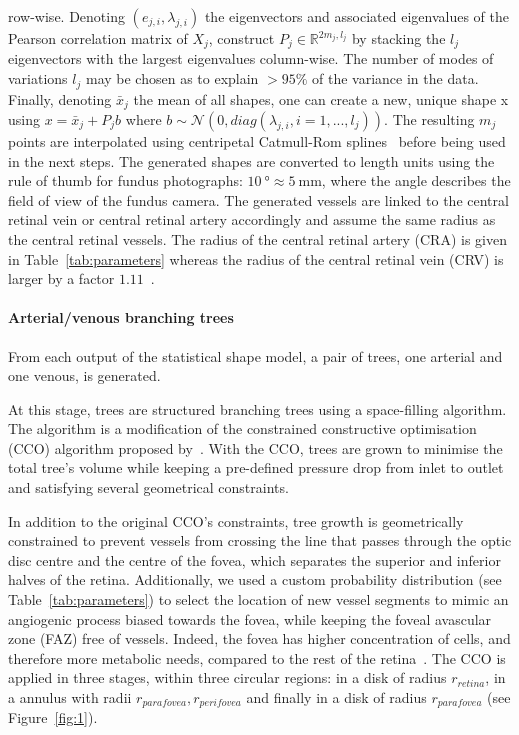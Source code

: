 \documentclass[11pt,]{article}
\begin{document}
row-wise. Denoting $(e_{j,i}, \lambda_{j,i})$ the eigenvectors and
associated eigenvalues of the Pearson correlation matrix of $X_j$,
construct $P_j\in\mathbb R^{2m_j,l_j}$ by stacking the $l_j$
eigenvectors with the largest eigenvalues column-wise. The number of
modes of variations $l_j$ may be chosen as to explain $>95\%$ of the
variance in the data. Finally, denoting $\bar x_j$ the mean of all
shapes, one can create a new, unique shape x using $x=\bar x_j + P_jb$
where $b\sim\mathcal N(0,diag(\lambda_{j,i}, i=1,...,l_j))$. The
resulting $m_j$ points are interpolated using centripetal Catmull-Rom splines~\cite{Catmull_1974} before being used in the next steps.
The generated shapes are converted to length units using the rule of thumb for fundus photographs: $\SI{10}{\degree}\approx\SI{5}{\mm}$, where the angle describes the
field of view of the fundus camera. The generated vessels are linked
to the central retinal vein or central retinal artery accordingly and
assume the same radius as the central retinal vessels.
The radius of the central retinal artery (CRA) is given in Table~\ref{tab:parameters} whereas the radius of the
central retinal vein (CRV) is larger by a factor $1.11$~\cite{Goldenberg2013}.

\paragraph{Arterial/venous branching trees}\label{sec:CCO}

From each output of the statistical shape model, a pair of trees, one
arterial and one venous, is generated.

At this stage, trees are structured branching trees using a
space-filling algorithm. The algorithm is a modification of the
constrained constructive optimisation (CCO) algorithm proposed
by~\cite{Talou2021}. With the CCO, trees are grown to minimise the
total tree’s volume while keeping a pre-defined pressure drop from
inlet to outlet and satisfying several geometrical constraints.

In addition to the original CCO’s constraints, tree growth is
geometrically constrained to prevent vessels from crossing the line
that passes through the optic disc centre and the centre of the fovea,
which separates the superior and inferior halves of the
retina. Additionally, we used a custom probability distribution
(see Table~\ref{tab:parameters}) 
to select the location of new vessel segments to mimic an angiogenic
process biased towards the fovea, while keeping the foveal avascular
zone (FAZ) free of vessels. 
Indeed, the fovea has higher concentration
of cells, and therefore more metabolic needs, compared to the rest of
the retina~\cite{Zouache2022}.
The CCO is applied in three stages, within three circular regions: in
a disk of radius $r_{retina}$, in a annulus with radii $r_{parafovea},
r_{perifovea}$ and finally in a disk of radius $r_{parafovea}$
(see Figure~\ref{fig:1}).
\end{document}
